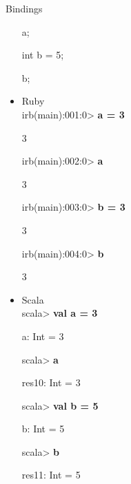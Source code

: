 \documentclass{beamer}
\begin{document}
\begin{frame}[allowframebreaks]{Bindings}
\begin{itemize}
{\ttfamily\color{black}
a;}

{\ttfamily\color{black}
\textcolor[rgb]{0.13333334,0.54509807,0.13333334}{int}
\textcolor[rgb]{0.627451,0.32156864,0.1764706}{b} = 5;}

{\ttfamily\color{black}
b;}
  \item Ruby\\
{\ttfamily\color{black}
%
\textcolor[rgb]{0.0,0.0,0.8039216}{irb(main):001:0{\textgreater}
}\textbf{a = 3}}

{\ttfamily\color{black}
3}

{\ttfamily\color{black}
\textcolor[rgb]{0.0,0.0,0.8039216}{irb(main):002:0{\textgreater}
}\textbf{a}}

{\ttfamily\color{black}
3}

{\ttfamily\color{black}
\textcolor[rgb]{0.0,0.0,0.8039216}{irb(main):003:0{\textgreater}
}\textbf{b = 3}}

{\ttfamily\color{black}
3}

{\ttfamily\color{black}
\textcolor[rgb]{0.0,0.0,0.8039216}{irb(main):004:0{\textgreater}
}\textbf{b}}

{\ttfamily\color{black}
3}
  \item Scala\\
{\ttfamily\color{black}
%
\textcolor[rgb]{0.0,0.0,0.8039216}{scala{\textgreater} }\textbf{val a =
3}}

{\ttfamily\color[rgb]{0.54509807,0.13333334,0.32156864}
a: Int = 3}


\bigskip

{\ttfamily\color{black}
\textcolor[rgb]{0.0,0.0,0.8039216}{scala{\textgreater} }\textbf{a}}

{\ttfamily\color[rgb]{0.54509807,0.13333334,0.32156864}
res10: Int = 3}


\bigskip

{\ttfamily\color{black}
\textcolor[rgb]{0.0,0.0,0.8039216}{scala{\textgreater} }\textbf{val b =
5}}

{\ttfamily\color[rgb]{0.54509807,0.13333334,0.32156864}
b: Int = 5}


\bigskip

{\ttfamily\color{black}
\textcolor[rgb]{0.0,0.0,0.8039216}{scala{\textgreater} }\textbf{b}}

{\ttfamily\color[rgb]{0.54509807,0.13333334,0.32156864}
res11: Int = 5}
  \end{itemize}
\end{frame}
\end{document}
